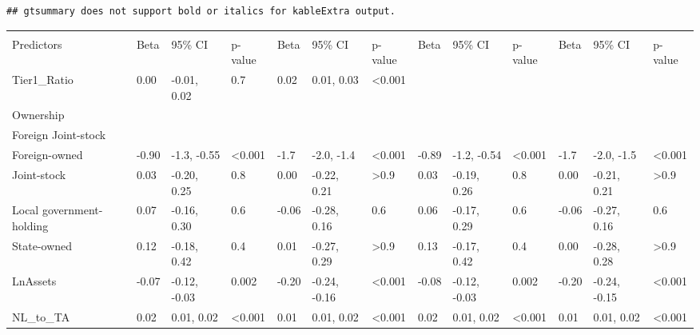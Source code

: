 \documentclass{article}
\begin{document}
\begin{verbatim}
## gtsummary does not support bold or italics for kableExtra output.
\end{verbatim}

\begingroup\fontsize{6}{8}\selectfont

\begin{tabu} to 
\hline
{} &  &  &  &  \\
   
Predictors & Beta & 95\% CI & p-value & Beta & 95\% CI & p-value & Beta & 95\% CI & p-value & Beta & 95\% CI & p-value\\
\hline
Tier1\_Ratio & 0.00 & -0.01, 0.02 & 0.7 & 0.02 & 0.01, 0.03 & <0.001 &  &  &  &  &  & \\
\hline
Ownership &  &  &  &  &  &  &  &  &  &  &  & \\
\hline
\hspace{1em}Foreign Joint-stock &  &  &  &  &  &  &  &  &  &  &  & \\
\hline
\hspace{1em}Foreign-owned & -0.90 & -1.3, -0.55 & <0.001 & -1.7 & -2.0, -1.4 & <0.001 & -0.89 & -1.2, -0.54 & <0.001 & -1.7 & -2.0, -1.5 & <0.001\\
\hline
\hspace{1em}Joint-stock & 0.03 & -0.20, 0.25 & 0.8 & 0.00 & -0.22, 0.21 & >0.9 & 0.03 & -0.19, 0.26 & 0.8 & 0.00 & -0.21, 0.21 & >0.9\\
\hline
\hspace{1em}Local government-holding & 0.07 & -0.16, 0.30 & 0.6 & -0.06 & -0.28, 0.16 & 0.6 & 0.06 & -0.17, 0.29 & 0.6 & -0.06 & -0.27, 0.16 & 0.6\\
\hline
\hspace{1em}State-owned & 0.12 & -0.18, 0.42 & 0.4 & 0.01 & -0.27, 0.29 & >0.9 & 0.13 & -0.17, 0.42 & 0.4 & 0.00 & -0.28, 0.28 & >0.9\\
\hline
LnAssets & -0.07 & -0.12, -0.03 & 0.002 & -0.20 & -0.24, -0.16 & <0.001 & -0.08 & -0.12, -0.03 & 0.002 & -0.20 & -0.24, -0.15 & <0.001\\
\hline
NL\_to\_TA & 0.02 & 0.01, 0.02 & <0.001 & 0.01 & 0.01, 0.02 & <0.001 & 0.02 & 0.01, 0.02 & <0.001 & 0.01 & 0.01, 0.02 & <0.001\\

\end{tabu}
\end{document}
